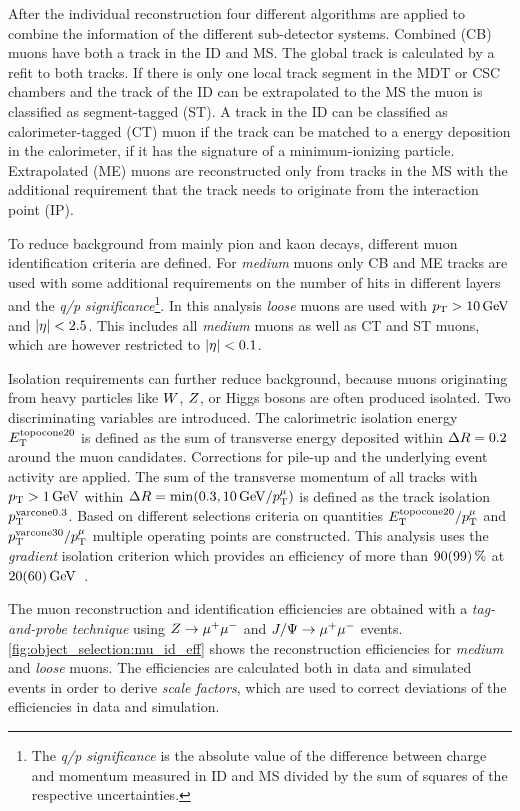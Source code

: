 After the individual reconstruction four different algorithms are applied to combine the information of the different
sub-detector systems.
Combined (CB) muons have both a track in the ID and MS\@. The global track is calculated by a refit to both tracks.
If there is only one local track segment in the MDT or CSC chambers and the track of the ID can be extrapolated to the MS
the muon is classified as segment-tagged (ST).
A track in the ID can be classified as calorimeter-tagged (CT) muon if the track can be matched to a energy deposition
in the calorimeter, if it has the signature of a minimum-ionizing particle.
Extrapolated (ME) muons are reconstructed only from tracks in the MS with the additional requirement that the track
needs to originate from the interaction point (IP)\@.

To reduce background from mainly pion and kaon decays, different muon identification criteria are defined.
For \emph{medium} muons only CB and ME tracks are used with some additional requirements on the number of hits in
different layers and the \emph{q/p significance}\footnote{The \emph{q/p significance} is the absolute value of the
difference between charge and momentum measured in ID and MS divided by the sum of squares of the respective uncertainties.}.
In this analysis \emph{loose} muons are used with $\pt > \unit[10]{GeV}$ and $\left|\eta\right| < 2.5$.
This includes all \emph{medium} muons as well as CT and ST muons, which are however restricted to $\left|\eta\right| < 0.1$.

Isolation requirements can further reduce background, because muons originating from heavy particles like $W$, $Z$,
or Higgs bosons are often produced isolated. Two discriminating variables are introduced.
The calorimetric isolation energy $E_\text{T}^{\text{topocone}20}$ is defined as the sum of transverse energy deposited within
$\Delta R = 0.2$ around the muon candidates.
Corrections for pile-up and the underlying event activity are applied.
The sum of the transverse momentum of all tracks with $\pt > \unit[1]{GeV}$ within $\dr = \min(0.3, \unit[10]{GeV} / \pt^\mu)$
is defined as the track isolation $p_\text{T}^{\text{varcone}0.3}$.
Based on different selections criteria on quantities $E_\text{T}^{\text{topocone}20} / p_\text{T}^\mu$ and
$p_\text{T}^{\text{varcone}30} / p_\text{T}^\mu$ multiple operating points are constructed.
This analysis uses the \emph{gradient} isolation criterion which provides an efficiency of more than
$\unit[90(99)]{\%}$ at $\unit[20(60)]{GeV}$~\cite{PERF-2015-10}.

The muon reconstruction and identification efficiencies are obtained with a \emph{tag-and-probe technique} using
$Z \to \mu^+\mu^-$ and $J/\Psi \to \mu^+\mu^-$ events.
\cref{fig:object_selection:mu_id_eff} shows the reconstruction efficiencies for \emph{medium} and \emph{loose} muons.
The efficiencies are calculated both in data and simulated events in order to derive \emph{scale factors}, which are used
to correct deviations of the efficiencies in data and simulation.

